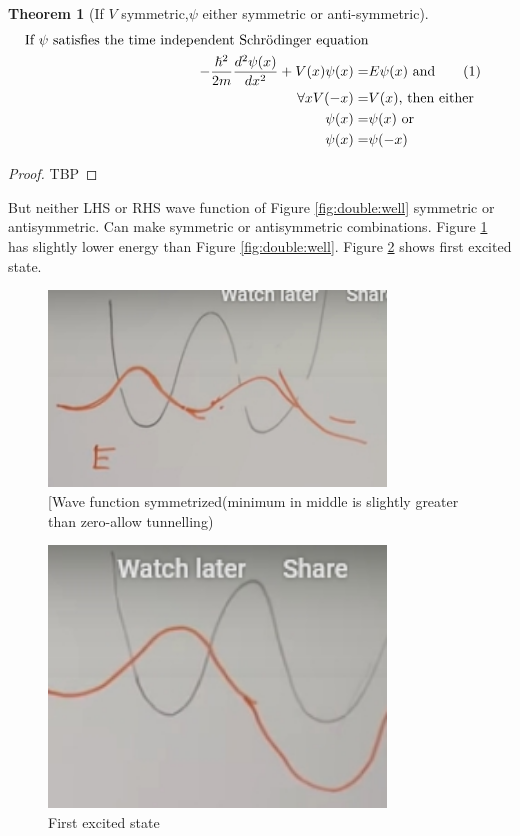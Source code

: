 \documentclass[]{article}
\newcommand\numberthis{\addtocounter{equation}{1}\tag{\theequation}}
\newtheorem{thm}{Theorem}
\begin{document}
\begin{thm}[If $V$ symmetric,$\psi$ either symmetric or anti-symmetric]
	\begin{align*}
	\text{If  $\psi$ satisfies the time independent Schr\"odinger equation}\\
	-\frac{\hslash^2}{2m}\frac{d^2 \psi(x)}{d x^2} + V(x)\psi(x) =& E\psi(x) \text{ and}\numberthis \label{eq:ti:schroedinger}\\
	\forall x V(-x) =& V(x)\text{, then either}\\
	\psi(x) =& \psi(x)\text{ or}\\
	\psi(x) =& \psi(-x)
	\end{align*}
\end{thm}

\begin{proof}
	TBP
\end{proof}

But neither LHS or RHS wave function of Figure \ref{fig:double:well} symmetric or antisymmetric. Can make symmetric or antisymmetric combinations. Figure \ref{fig:double:well:symmetrized} has slightly lower energy than Figure \ref{fig:double:well}. Figure \ref{fig:double:well:1st} shows first excited state.

\begin{figure}[H]
	\caption[Wave function symmetrized]{[Wave function symmetrized(minimum in middle is slightly greater than zero-allow tunnelling)}\label{fig:double:well:symmetrized}
	\includegraphics[width=0.8\textwidth]{particle_mixed_symmetrized}
\end{figure}

\begin{figure}[H]
	\caption{First excited state}\label{fig:double:well:1st}
	\includegraphics[width=0.8\textwidth]{particle_mixed_1st_excited}
\end{figure}
\end{document}
